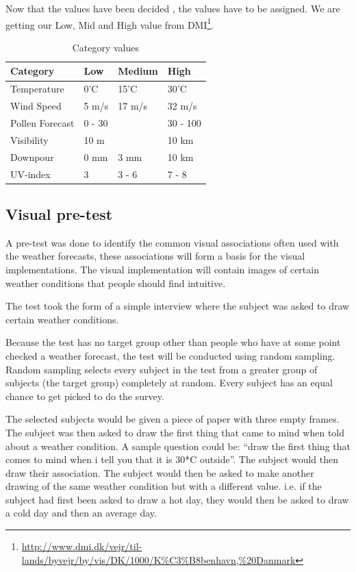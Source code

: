 Now that the values have been decided , the values have to be assigned. We are getting our Low, Mid and High value from DMI\footnote{\url{http://www.dmi.dk/vejr/til-lands/byvejr/by/vis/DK/1000/K\%C3\%B8benhavn,\%20Danmark}}.

\begin{table}[!h]
\centering
\begin{tabular}{l | l | l | l}
Category & Low & Medium & High \\
\hline \hline
Temperature & 0'C & 15'C & 30'C \\
Wind Speed & 5 m/s & 17 m/s & 32 m/s \\
Pollen Forecast & 0 - 30 & & 30 - 100 \\
Visibility & 10 m & & 10 km \\
Downpour & 0 mm & 3 mm & 10 km \\
UV-index & 3 & 3 - 6 & 7 - 8 
\end{tabular}
\caption{Category values}
\label{tab:category_values}
\end{table}


\subsection{Visual pre-test} %
\label{sub:visual_pre_test}

A pre-test was done to identify the common visual associations often used with the weather forecasts, these associations will form a basis for the visual implementations. 
The visual implementation will contain images of certain weather conditions that people should find intuitive.

The test took the form of a simple interview where the subject was asked to draw certain weather conditions.

Because the test has no target group other than people who have at some point checked a weather forecast, the test will be conducted using random sampling.
Random sampling selects every subject in the test from a greater group of subjects (the target group) completely at random. 
Every subject has an equal chance to get picked to do the survey.

The selected subjects would be given a piece of paper with three empty frames. 
The subject was then asked to draw the first thing that came to mind when told about a weather condition. 
A sample question could be: \enquote{draw the first thing that comes to mind when i tell you that it is 30*C outside}. 
The subject would then draw their association. 
The subject would then be asked to make another drawing of the same weather condition but with a different value. 
i.e. if the subject had first been asked to draw a hot day, they would then be asked to draw a cold day and then an average day.

